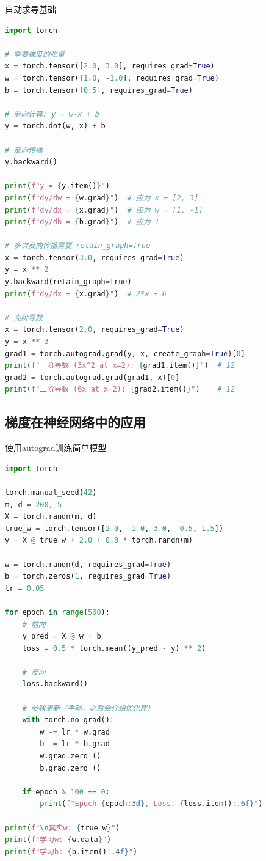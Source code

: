 \begin{mycode}{自动求导基础}
\begin{lstlisting}[language=Python]
import torch

# 需要梯度的张量
x = torch.tensor([2.0, 3.0], requires_grad=True)
w = torch.tensor([1.0, -1.0], requires_grad=True)
b = torch.tensor([0.5], requires_grad=True)

# 前向计算: y = w·x + b
y = torch.dot(w, x) + b

# 反向传播
y.backward()

print(f"y = {y.item()}")
print(f"dy/dw = {w.grad}")  # 应为 x = [2, 3]
print(f"dy/dx = {x.grad}")  # 应为 w = [1, -1]
print(f"dy/db = {b.grad}")  # 应为 1

# 多次反向传播需要 retain_graph=True
x = torch.tensor(3.0, requires_grad=True)
y = x ** 2
y.backward(retain_graph=True)
print(f"dy/dx = {x.grad}")  # 2*x = 6

# 高阶导数
x = torch.tensor(2.0, requires_grad=True)
y = x ** 3
grad1 = torch.autograd.grad(y, x, create_graph=True)[0]
print(f"一阶导数 (3x^2 at x=2): {grad1.item()}")  # 12
grad2 = torch.autograd.grad(grad1, x)[0]
print(f"二阶导数 (6x at x=2): {grad2.item()}")    # 12
\end{lstlisting}
\end{mycode}

\subsection{梯度在神经网络中的应用}

\begin{mycode}{使用autograd训练简单模型}
\begin{lstlisting}[language=Python]
import torch

torch.manual_seed(42)
m, d = 200, 5
X = torch.randn(m, d)
true_w = torch.tensor([2.0, -1.0, 3.0, -0.5, 1.5])
y = X @ true_w + 2.0 + 0.3 * torch.randn(m)

w = torch.randn(d, requires_grad=True)
b = torch.zeros(1, requires_grad=True)
lr = 0.05

for epoch in range(500):
    # 前向
    y_pred = X @ w + b
    loss = 0.5 * torch.mean((y_pred - y) ** 2)

    # 反向
    loss.backward()

    # 参数更新（手动，之后会介绍优化器）
    with torch.no_grad():
        w -= lr * w.grad
        b -= lr * b.grad
        w.grad.zero_()
        b.grad.zero_()

    if epoch % 100 == 0:
        print(f"Epoch {epoch:3d}, Loss: {loss.item():.6f}")

print(f"\n真实w: {true_w}")
print(f"学习w: {w.data}")
print(f"学习b: {b.item():.4f}")
\end{lstlisting}
\end{mycode}

